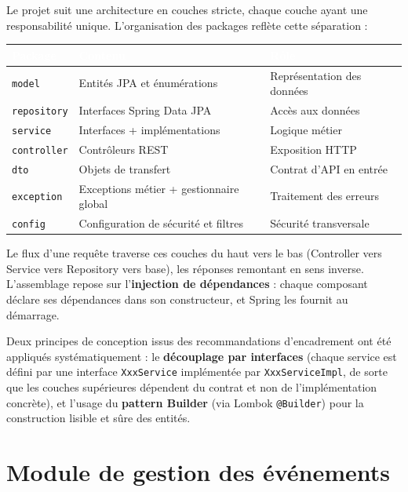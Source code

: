 \documentclass[12pt,a4paper]{report}
\newcommand{\code}[1]{\textcolor{codecolor}{\texttt{#1}}}
\begin{document}
Le projet suit une architecture en couches stricte, chaque couche ayant une responsabilité unique. L'organisation des packages reflète cette séparation :

\begin{center}\small
\begin{longtable}{|p{5.00cm}|p{5.00cm}|p{5.00cm}|}
\hline
\rowcolor{entetetable}
\textbf{\textcolor{white}{Package}} & \textbf{\textcolor{white}{Contenu}} & \textbf{\textcolor{white}{Rôle}} \\ \hline
\code{model} & Entités JPA et énumérations & Représentation des données \\ \hline
\code{repository} & Interfaces Spring Data JPA & Accès aux données \\ \hline
\code{service} & Interfaces + implémentations & Logique métier \\ \hline
\code{controller} & Contrôleurs REST & Exposition HTTP \\ \hline
\code{dto} & Objets de transfert & Contrat d'API en entrée \\ \hline
\code{exception} & Exceptions métier + gestionnaire global & Traitement des erreurs \\ \hline
\code{config} & Configuration de sécurité et filtres & Sécurité transversale \\ \hline
\end{longtable}\end{center}

Le flux d'une requête traverse ces couches du haut vers le bas (Controller  vers  Service  vers  Repository  vers  base), les réponses remontant en sens inverse. L'assemblage repose sur l'\textbf{injection de dépendances} : chaque composant déclare ses dépendances dans son constructeur, et Spring les fournit au démarrage.

Deux principes de conception issus des recommandations d'encadrement ont été appliqués systématiquement : le \textbf{découplage par interfaces} (chaque service est défini par une interface \code{XxxService} implémentée par \code{XxxServiceImpl}, de sorte que les couches supérieures dépendent du contrat et non de l'implémentation concrète), et l'usage du \textbf{pattern Builder} (via Lombok \code{@Builder}) pour la construction lisible et sûre des entités.

\section{Module de gestion des événements}
\end{document}
